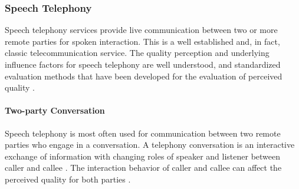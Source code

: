 \subsubsection*{Speech Telephony}\label{method:sct}
Speech telephony services provide live communication between two or more remote parties for spoken interaction.
This is a well established and, in fact, classic telecommunication service.
The quality perception and underlying influence factors for speech telephony are well understood, and standardized evaluation methods that have been developed for the evaluation of perceived quality \citep[\eg,][]{itu_handbook_1992}.

\paragraph*{Two-party Conversation}
Speech telephony is most often used for communication between two remote parties who engage in a conversation.
A telephony conversation is an interactive exchange of information with changing roles of speaker and listener between caller and callee \citep[][]{hopper_telephone_1992}.
The interaction behavior of caller and callee can affect the perceived quality for both parties \citep[\eg,][]{schoenenberg_why_2014, egger_it_2010}.


